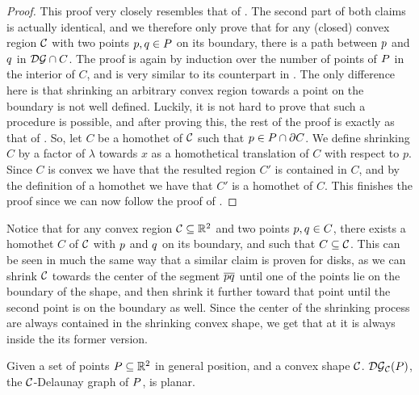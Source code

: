 \documentclass[12pt]{article}%
\begin{document}
\begin{proof}
	This proof very closely resembles that of . The second part of both claims is actually identical, and we therefore only prove that  for any (closed) convex region $\mathcal{C}$ with two points $p,q\in P$ on its boundary, there is a path between $p$ and $q$ in $\mathcal{DG} \cap {C}$.
	The proof is again by induction over the number of points of $P$ in the interior of $C$, and is very similar to its counterpart in . The only difference here is that shrinking an arbitrary convex region towards a point on the boundary is not well defined.
	Luckily, it is not hard to prove that such a procedure is possible, and after proving this, the rest of the proof is exactly as that of .
	So, let  $C$ be a homothet of $\mathcal{C}$ such that $p\in P\cap\partial C$. We define shrinking $C$ by a factor of $\lambda$ towards $x$ as a homothetical translation of $C$ with respect to $p$. Since $C$ is convex we have that the resulted region $C'$ is contained in $C$, and by the definition of a homothet we have that $C'$ is a homothet of $C$.
	This finishes the proof since we can now follow the proof of .

\end{proof}

Notice that for any convex region $\mathcal{C}\subseteq \mathbb{R}^2$ and two points $p,q \in C$, there exists a homothet $C$ of $\mathcal{C}$ with $p$ and $q$ on its boundary, and such that $C\subseteq \mathcal{C}$. This can be seen in much the same way that a similar claim is proven for disks, as we can shrink $\mathcal{C}$ towards the center of the segment $\overline{pq}$ until one of the points lie on the boundary of the shape, and then shrink it further toward that point until the second point is on the boundary as well. Since the center of the shrinking process are always contained in the shrinking convex shape, we get that at it is always inside the its former version.

\begin{claim}
	Given a set of points $P \subseteq \mathbb{R}^2$ in general position, and a convex shape $\mathcal{C}$. $\mathcal{DG}_{\mathcal{C}}(P)$, the $\mathcal{C}$-Delaunay graph of $P$, is planar.
	
\end{claim}
\end{document}
